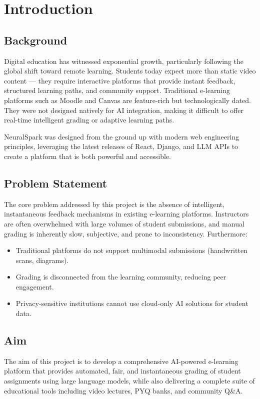 \documentclass[12pt,a4paper]{report}
\begin{document}
\chapter{Introduction}

\section{Background}
Digital education has witnessed exponential growth, particularly following the global shift toward
remote learning. Students today expect more than static video content — they require interactive
platforms that provide instant feedback, structured learning paths, and community support.
Traditional e-learning platforms such as Moodle and Canvas are feature-rich but technologically
dated. They were not designed natively for AI integration, making it difficult to offer real-time
intelligent grading or adaptive learning paths.

NeuralSpark was designed from the ground up with modern web engineering principles, leveraging
the latest releases of React, Django, and LLM APIs to create a platform that is both powerful
and accessible.

\section{Problem Statement}
The core problem addressed by this project is the absence of intelligent, instantaneous feedback
mechanisms in existing e-learning platforms. Instructors are often overwhelmed with large volumes
of student submissions, and manual grading is inherently slow, subjective, and prone to inconsistency.
Furthermore:

\begin{itemize}
    \item Traditional platforms do not support multimodal submissions (handwritten scans, diagrams).
    \item Grading is disconnected from the learning community, reducing peer engagement.
    \item Privacy-sensitive institutions cannot use cloud-only AI solutions for student data.
\end{itemize}

\section{Aim}
The aim of this project is to develop a comprehensive AI-powered e-learning platform that provides
automated, fair, and instantaneous grading of student assignments using large language models,
while also delivering a complete suite of educational tools including video lectures, PYQ banks,
and community Q\&A.
\end{document}
